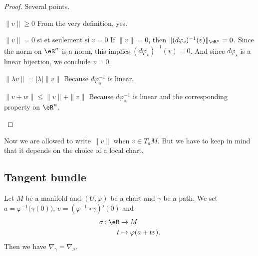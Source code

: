 \begin{proof}
    Several points.
    \begin{subproof}
    \item[\( \| v \|\geq 0\)]
        From the very definition, yes.
    \item[\( \| v \|=0\) si et seulement si \( v=0\)]
        If \( \| v \|=0\), then \( \| (d\varphi_s)^{-1}(v) \|_{\eR^n}=0\). Since the norm on \( \eR^n\) is a norm, this implies \( (d\varphi_s)^{-1}(v)=0\). And since \( d\varphi_s\) is a linear bijection, we conclude \( v=0\).
    \item[\( \| \lambda v \|=| \lambda |\| v \|\)]
        Because \( d\varphi_s^{-1}\) is linear.
    \item[\( \| v+w \|\leq \| v \|+\| v \|\)]
        Because \( d\varphi_s^{-1}\) is linear and the corresponding property on \( \eR^n\).
    \end{subproof}
\end{proof}

Now we are allowed to write \( \| v \|\) when \( v\in T_aM\). But we have to keep in mind that it depends on the choice of a local chart.

\subsection{Tangent bundle}


\begin{lemma}       \label{LEMooXFNQooXwCMNB}
    Let \( M\) be a manifold and \( (U,\varphi)\) be a chart and \( \gamma\) be a path. We set \( a=\varphi^{-1}\big( \gamma(0) \big)\), \(v= (\varphi^{-1}\circ\gamma)'(0)\) and
    \begin{equation}
        \begin{aligned}
            \sigma\colon \eR&\to M \\
            t&\mapsto \varphi(a+tv). 
        \end{aligned}
    \end{equation}
    Then we have \( \nabla_{\gamma}=\nabla_{\sigma}\).   
\end{lemma}

